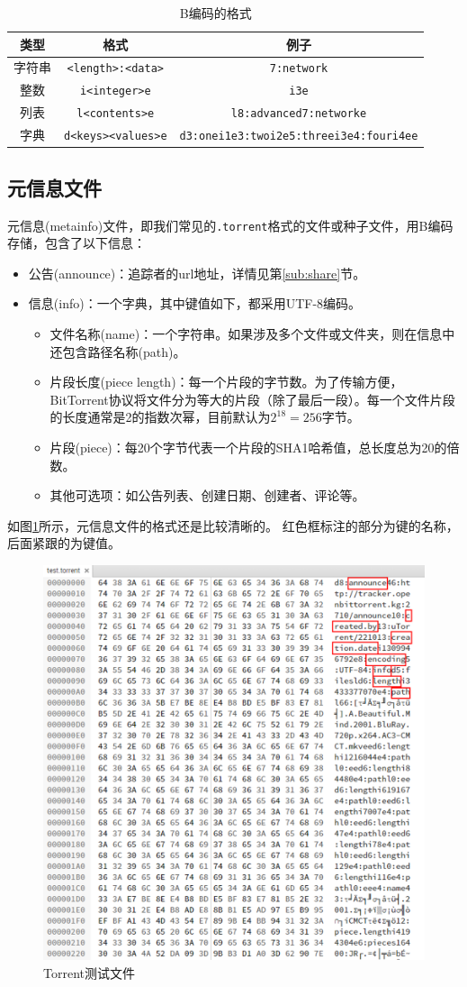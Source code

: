 \documentclass[thesis]{thesis}
\begin{document}
\begin{table}[htbp]
\caption{B编码的格式}
\label{tab:bencoding}
\centering
\begin{tabular}{|c|c|c|}\hline
\textbf{类型} & \textbf{格式} & \textbf{例子}\\\hline
字符串 & \verb'<length>:<data>' & \verb'7:network'\\\hline
整数 & \verb'i<integer>e' & \verb'i3e'\\\hline
列表 & \verb'l<contents>e' & \verb'l8:advanced7:networke'\\\hline
字典 & \verb'd<keys><values>e' & \verb'd3:onei1e3:twoi2e5:threei3e4:fouri4ee'\\\hline
\end{tabular}
\end{table}

\subsection{元信息文件}
\label{sub:metainfo}
元信息(metainfo)文件，即我们常见的\verb'.torrent'格式的文件或种子文件，用B编码存储，包含了以下信息：
\begin{itemize}
	\item 公告(announce)：追踪者的url地址，详情见第\ref{sub:share}节。
	\item 信息(info)：一个字典，其中键值如下，都采用UTF-8编码。
	\begin{itemize}
		\item 文件名称(name)：一个字符串。如果涉及多个文件或文件夹，则在信息中还包含路径名称(path)。
		\item 片段长度(piece length)：每一个片段的字节数。为了传输方便，BitTorrent协议将文件分为等大的片段（除了最后一段）。每一个文件片段的长度通常是2的指数次幂，目前默认为$2^{18}=256$字节。
		\item 片段(piece)：每20个字节代表一个片段的SHA1哈希值，总长度总为20的倍数。
		\item 其他可选项：如公告列表、创建日期、创建者、评论等。
	\end{itemize}
\end{itemize}

如图\ref{fig:test_torrent}所示，元信息文件的格式还是比较清晰的。
红色框标注的部分为键的名称，后面紧跟的为键值。
\begin{figure}[htbp]
\centering
\includegraphics[width=0.6\linewidth]{fig/test_torrent_new.PNG}
\caption{Torrent测试文件}
\label{fig:test_torrent}
\end{figure}
\end{document}
